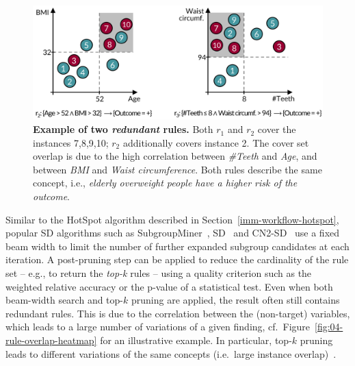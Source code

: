\documentclass[
  oneside]{book}
\begin{document}
\begin{figure}[htbp]

{\centering \includegraphics[width=0.8\linewidth]{figures/04-rule-redundancy} 

}

\caption{\textbf{Example of two \emph{redundant} rules.} Both \(r_1\) and \(r_2\) cover the instances 7,8,9,10; \(r_2\) additionally covers instance 2. The cover set overlap is due to the high correlation between \emph{\#Teeth} and \emph{Age}, and between \emph{BMI} and \emph{Waist circumference}. Both rules describe the same concept, i.e., \emph{elderly overweight people have a higher risk of the outcome}.}\label{fig:04-rule-redundancy}
\end{figure}

Similar to the HotSpot algorithm described in Section~\ref{imm-workflow-hotspot}, popular SD algorithms such as SubgroupMiner~\autocite{Kloesgen:SubgroupMiner2002},
SD~\autocite{Gamberger:SD02} and CN2-SD~\autocite{Lavravc:CN2-SD04} use a fixed beam width to limit the number of further expanded subgroup candidates at each iteration.
A post-pruning step can be applied to reduce the cardinality of the rule set -- e.g., to return the \emph{top-k} rules -- using a quality criterion such as the weighted relative accuracy or the p-value of a statistical test.
Even when both beam-width search and top-\(k\) pruning are applied, the result often still contains redundant rules.
This is due to the correlation between the (non-target) variables, which leads to a large number of variations of a given finding, cf.~Figure~\ref{fig:04-rule-overlap-heatmap} for an illustrative example.
In particular, top-\(k\) pruning leads to different variations of the same concepts (i.e.~large instance overlap)~\autocite{VanLeeuwen:DSSD12}.
\end{document}
